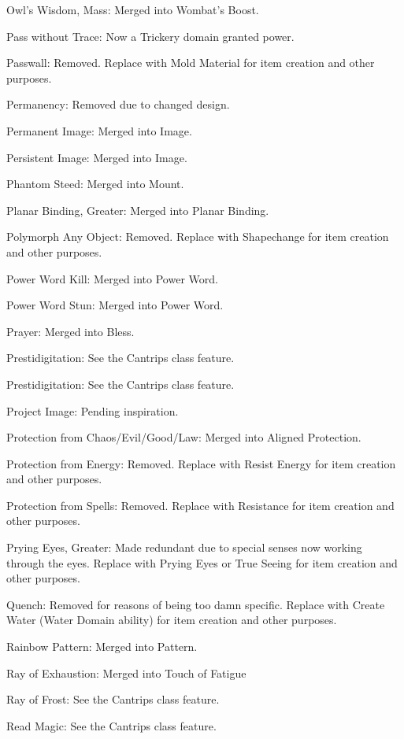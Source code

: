 {\begin{list}{}{\leftmargin=1em}
 \item Owl's Wisdom, Mass: Merged into Wombat's Boost.
 \item Pass without Trace: Now a Trickery domain granted power.
 \item Passwall: Removed. Replace with Mold Material for item creation and other purposes.
 \item Permanency: Removed due to changed design.
 \item Permanent Image: Merged into Image.
 \item Persistent Image: Merged into Image.
 \item Phantom Steed: Merged into Mount.
 \item Planar Binding, Greater: Merged into Planar Binding.
 \item Polymorph Any Object: Removed. Replace with Shapechange for item creation and other purposes.
 \item Power Word Kill: Merged into Power Word.
 \item Power Word Stun: Merged into Power Word.
 \item Prayer: Merged into Bless.
 \item Prestidigitation: See the Cantrips class feature.
 \item Prestidigitation: See the Cantrips class feature.
 \item Project Image: Pending inspiration.
 \item Protection from Chaos/Evil/Good/Law: Merged into Aligned Protection.
 \item Protection from Energy: Removed. Replace with Resist Energy for item creation and other purposes.
 \item Protection from Spells: Removed. Replace with Resistance for item creation and other purposes.
 \item Prying Eyes, Greater: Made redundant due to special senses now working through the eyes. Replace with Prying Eyes or True Seeing for item creation and other purposes.
 \item Quench: Removed for reasons of being too damn specific. Replace with Create Water (Water Domain ability) for item creation and other purposes.
 \item Rainbow Pattern: Merged into Pattern.
 \item Ray of Exhaustion: Merged into Touch of Fatigue
 \item Ray of Frost: See the Cantrips class feature.
 \item Read Magic: See the Cantrips class feature.

\end{list}}
